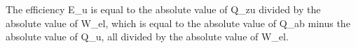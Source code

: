 The efficiency E_u is equal to the absolute value of Q_zu divided by the absolute value of W_el, which is equal to the absolute value of Q_ab minus the absolute value of Q_u, all divided by the absolute value of W_el.